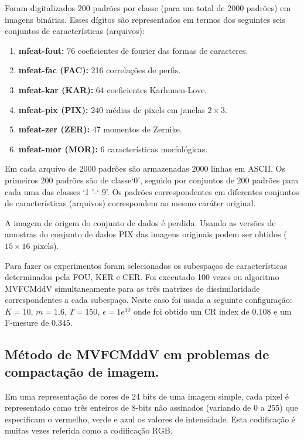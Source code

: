 \documentclass[12pt]{article}
\begin{document}
Foram digitalizados 200 padrões por classe (para um total de 2000 padrões) em imagens binárias. Esses dígitos são representados em termos dos seguintes seis conjuntos de características (arquivos):

\begin{enumerate}
\item \textbf{mfeat-fout:} 76 coeficientes de fourier das formas de caracteres.
\item \textbf{mfeat-fac (FAC):} 216 correlações de perfis.
\item \textbf{mfeat-kar (KAR):} 64 coeficientes Karhunen-Love.
\item \textbf{mfeat-pix (PIX):} 240 médias de pixels em janelas $ 2 \times 3 $.
\item \textbf{mfeat-zer (ZER):} 47 momentos de Zernike.
\item \textbf{mfeat-mor (MOR):} 6 características morfológicas.
\end{enumerate}

Em cada arquivo de 2000 padrões são armazenadas 2000 linhas em ASCII. Os primeiros 200 padrões são de classe`0', seguido por conjuntos de 200 padrões para cada uma das classes `1 '-` 9'. Os padrões correspondentes em diferentes conjuntos de características (arquivos) correspondem ao mesmo caráter original.

A imagem de origem do conjunto de dados é perdida.
Usando as versões de amostras  do conjunto de dados PIX das imagens originais podem ser obtidos ($15 \times 16$ pixels).

Para fazer os experimentos foram selecionados os subespaços de características determinados pela FOU, KER e CER. Foi executado 100 vezes ou algoritmo MVFCMddV simultaneamente para as três matrizes de dissimilaridade correspondentes a cada subespaço. Neste caso foi usada a seguinte configuração: $K =10$, $m = 1.6$, $T = 150$, $\epsilon = 1e^{10}$ onde foi obtido um CR index de $0.108$ e um F-mesure de $0.345$. 

\subsection{Método de MVFCMddV em problemas de compactação de imagem.}

Em uma representação de cores de 24 bits de uma imagem simple, cada pixel é representado como três enteiros de 8-bits não assinados (variando de 0 a 255) que especificam o vermelho, verde e azul os valores de intensidade. Esta codificação é muitas vezes referida como a codificação RGB.
\end{document}
